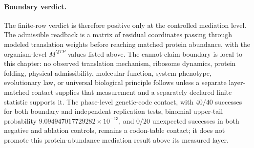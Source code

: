 \paragraph{Boundary verdict.}
The finite-row verdict is therefore positive only at the controlled mediation level.  The admissible readback is a matrix of residual coordinates passing through modeled translation weights before reaching matched protein abundance, with the organism-level $M^{QTP}$ values listed above.  The cannot-claim boundary is local to this chapter: no observed translation mechanism, ribosome dynamics, protein folding, physical admissibility, molecular function, system phenotype, evolutionary law, or universal biological principle follows unless a separate layer-matched contact supplies that measurement and a separately declared finite statistic supports it.  The phase-level genetic-code contact, with $40/40$ successes for both boundary and independent replication tests, binomial upper-tail probability $9.094947017729282\times10^{-13}$, and $0/20$ unexpected successes in both negative and ablation controls, remains a codon-table contact; it does not promote this protein-abundance mediation result above its measured layer.
